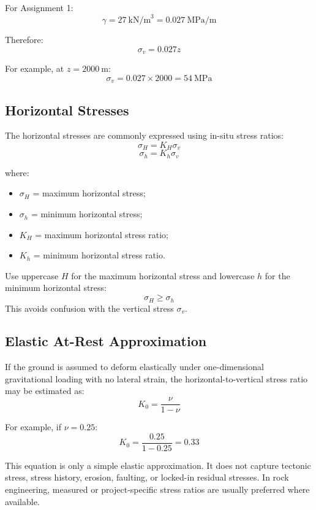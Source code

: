 \documentclass[a4paper,12pt]{article}
\begin{document}
For Assignment 1:
\[
\gamma = 27~\text{kN/m}^3 = 0.027~\text{MPa/m}
\]

Therefore:
\[
\sigma_v = 0.027z
\]

For example, at \(z=2000~\text{m}\):
\[
\sigma_v = 0.027 \times 2000 = 54~\text{MPa}
\]

\subsection{Horizontal Stresses}

The horizontal stresses are commonly expressed using in-situ stress ratios:
\[
\sigma_H = K_H \sigma_v
\]
\[
\sigma_h = K_h \sigma_v
\]

where:
\begin{itemize}
    \item \(\sigma_H\) = maximum horizontal stress;
    \item \(\sigma_h\) = minimum horizontal stress;
    \item \(K_H\) = maximum horizontal stress ratio;
    \item \(K_h\) = minimum horizontal stress ratio.
\end{itemize}

\begin{notebox}[Notation]
Use uppercase \(H\) for the maximum horizontal stress and lowercase \(h\) for the
minimum horizontal stress:
\[
\sigma_H \geq \sigma_h
\]
This avoids confusion with the vertical stress \(\sigma_v\).
\end{notebox}

\subsection{Elastic At-Rest Approximation}

If the ground is assumed to deform elastically under one-dimensional gravitational loading
with no lateral strain, the horizontal-to-vertical stress ratio may be estimated as:
\[
K_0 = \frac{\nu}{1-\nu}
\]

For example, if \(\nu = 0.25\):
\[
K_0 = \frac{0.25}{1-0.25} = 0.33
\]

\begin{warnbox}[Do not overuse \(K_0=\nu/(1-\nu)\)]
This equation is only a simple elastic approximation. It does not capture tectonic stress,
stress history, erosion, faulting, or locked-in residual stresses. In rock engineering,
measured or project-specific stress ratios are usually preferred where available.
\end{warnbox}
\end{document}
